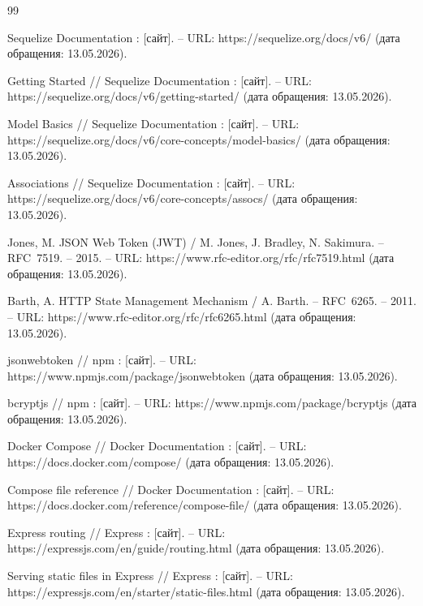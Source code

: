 \clearpage
{}

\begin{thebibliography}{99}
	
	Sequelize Documentation : [сайт]. – URL: https://sequelize.org/docs/v6/ (дата обращения: 13.05.2026).
	
	Getting Started // Sequelize Documentation : [сайт]. – URL: https://sequelize.org/docs/v6/getting-started/ (дата обращения: 13.05.2026).
	
	Model Basics // Sequelize Documentation : [сайт]. – URL: https://sequelize.org/docs/v6/core-concepts/model-basics/ (дата обращения: 13.05.2026).
	
	Associations // Sequelize Documentation : [сайт]. – URL: https://sequelize.org/docs/v6/core-concepts/assocs/ (дата обращения: 13.05.2026).
	
	Jones, M. JSON Web Token (JWT) / M. Jones, J. Bradley, N. Sakimura. – RFC~7519. – 2015. – URL: https://www.rfc-editor.org/rfc/rfc7519.html (дата обращения: 13.05.2026).
	
	Barth, A. HTTP State Management Mechanism / A. Barth. – RFC~6265. – 2011. – URL: https://www.rfc-editor.org/rfc/rfc6265.html (дата обращения: 13.05.2026).
	
	jsonwebtoken // npm : [сайт]. – URL: https://www.npmjs.com/package/jsonwebtoken (дата обращения: 13.05.2026).
	
	bcryptjs // npm : [сайт]. – URL: https://www.npmjs.com/package/bcryptjs (дата обращения: 13.05.2026).
	
	Docker Compose // Docker Documentation : [сайт]. – URL: https://docs.docker.com/compose/ (дата обращения: 13.05.2026).
	
	Compose file reference // Docker Documentation : [сайт]. – URL: https://docs.docker.com/reference/compose-file/ (дата обращения: 13.05.2026).
	
	Express routing // Express : [сайт]. – URL: https://expressjs.com/en/guide/routing.html (дата обращения: 13.05.2026).
	
	Serving static files in Express // Express : [сайт]. – URL: https://expressjs.com/en/starter/static-files.html (дата обращения: 13.05.2026).
	

\end{thebibliography}
